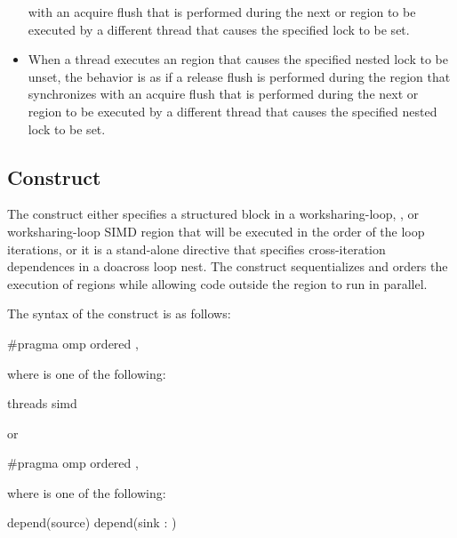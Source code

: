 \begin{itemize}
      with an acquire flush that is performed during the next
       or  region to be executed by a
      different thread that causes the specified lock to be set.
\item When a thread executes an  region that causes
      the specified nested lock to be unset, the behavior is as if a release flush
      is performed during the  region that
      synchronizes with an acquire flush that is performed during the next
       or  region to be
      executed by a different thread that causes the specified nested lock to be set.  
\end{itemize}



\subsection{ Construct}
\label{subsec:ordered Construct}
\summary
The  construct either specifies a structured block in a
worksharing-loop, , or worksharing-loop SIMD region that will 
be executed in the order of the loop iterations, or it is a stand-alone 
directive that specifies cross-iteration dependences in a doacross loop 
nest. The  construct sequentializes and orders the execution 
of  regions while allowing code outside the region to run in parallel.

\syntax
\begin{ccppspecific}
The syntax of the  construct is as follows:

\begin{ompcPragma}
#pragma omp ordered \plc{[clause[ [},\plc{] clause] ]} 
\end{ompcPragma}

where  is one of the following:
\begin{indentedcodelist}
threads
simd
\end{indentedcodelist}

or

\begin{ompcPragma}
#pragma omp ordered \plc{clause [[[},\plc{] clause] ... ]} 
\end{ompcPragma}
where  is one of the following:
\begin{indentedcodelist}
depend(source)
depend(sink : )
\end{indentedcodelist}


\end{ccppspecific}

